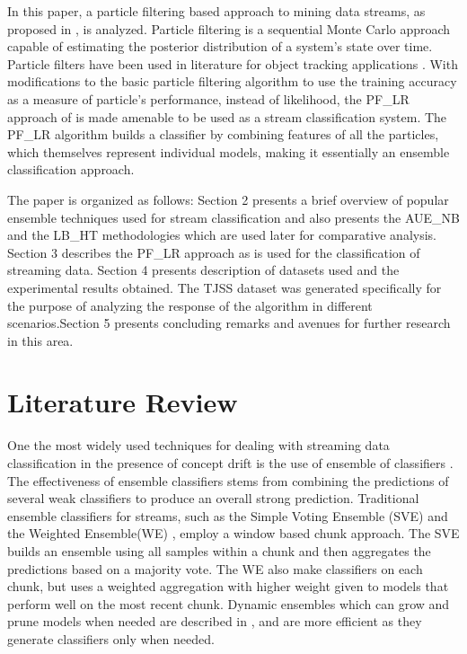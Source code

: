 \documentclass[conference]{IEEEtran}
\begin{document}
In this paper, a particle filtering based approach to mining data streams, as proposed in \cite{pflr}, is analyzed. Particle filtering is a sequential Monte Carlo approach capable of estimating the posterior distribution of a system's state over time. Particle filters have been used in literature for object tracking applications \cite{Ristic}. With modifications to the basic particle filtering algorithm to use the training accuracy as a measure of particle's performance, instead of likelihood, the PF\_LR approach of \cite{pflr} is made amenable to be used as a stream classification system. The PF\_LR algorithm builds a classifier by combining features of all the particles, which themselves represent individual models, making it essentially an ensemble classification approach. 

The paper is organized as follows: Section 2 presents a brief overview of popular ensemble techniques used for stream classification and also presents the AUE\_NB and the LB\_HT methodologies which are used later for comparative analysis. Section 3 describes the PF\_LR approach as is used for the classification of streaming data. Section 4 presents description of datasets used and the experimental results obtained. The TJSS dataset was generated specifically for the purpose of analyzing the response of the algorithm  in different scenarios.Section 5 presents concluding remarks and avenues for further research in this area. 




\section{Literature Review}
One the most widely used techniques for dealing with streaming data classification in the presence of concept drift is the use of ensemble of classifiers \cite{Kong and Yu(2011)}. The effectiveness of ensemble classifiers stems from combining the predictions of several weak classifiers to produce an overall strong prediction. Traditional ensemble classifiers for streams, such as the Simple Voting Ensemble (SVE) \cite{Street and Kim(2001)} and the Weighted Ensemble(WE) \cite{Wang 2003}\cite{Littlestone and Warmuth(1989)}, employ a window based chunk approach. The SVE builds an ensemble using all samples within a chunk and then aggregates the predictions based on a majority vote. The WE also make classifiers on each chunk, but uses a weighted aggregation with higher weight given to models that perform well on the most recent chunk. Dynamic ensembles which can grow and prune models when needed are described in \cite{Kolter and Maloof(2007)}, and are more efficient as they generate classifiers only when needed.
\end{document}
